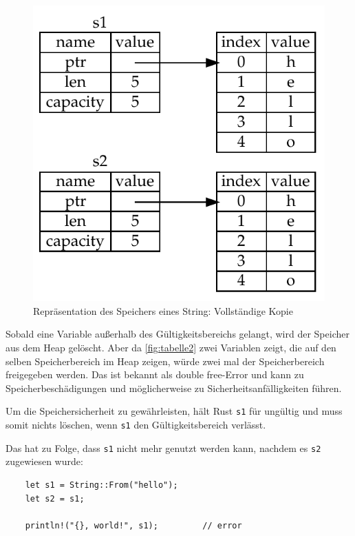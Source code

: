 \begin{figure}[htbp]
    \centering
    \includegraphics[scale=0.9]{Programmierung/Tabelle3.pdf}
    \caption{Repräsentation des Speichers eines String: Vollständige Kopie}
    \label{fig:tabelle3}
\end{figure}

Sobald eine Variable außerhalb des Gültigkeitsbereichs gelangt, wird der Spei\-cher aus dem Heap gelöscht. Aber da \autoref{fig:tabelle2} zwei Variablen zeigt, die auf den selben Speicherbereich im Heap zeigen, würde zwei mal der Speicherbereich freigegeben werden. Das ist bekannt als \glqq double free\grqq{}-Error und kann zu Speicherbeschädigungen und möglicherweise zu Sicherheitsanfälligkeiten führen.

Um die Speichersicherheit zu gewährleisten, hält Rust \verb"s1" für ungültig und muss somit nichts löschen, wenn \verb"s1" den Gültigkeitsbereich verlässt.

Das hat zu Folge, dass \verb"s1" nicht mehr genutzt werden kann, nachdem es \verb"s2" zugewiesen wurde:

\begin{lstlisting}
    let s1 = String::From("hello");
    let s2 = s1;

    println!("{}, world!", s1);         // error
\end{lstlisting}

